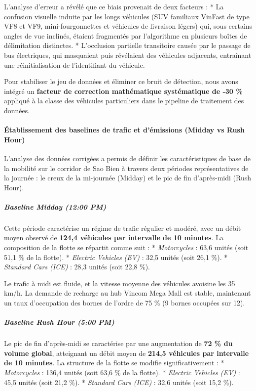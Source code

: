 \documentclass[10pt, a4paper]{article}
\begin{document}
L'analyse d'erreur a révélé que ce biais provenait de deux facteurs : *
La confusion visuelle induite par les longs véhicules (SUV familiaux
VinFast de type VF8 et VF9, mini-fourgonnettes et véhicules de livraison
légers) qui, sous certains angles de vue inclinés, étaient fragmentés
par l'algorithme en plusieurs boîtes de délimitation distinctes. *
L'occlusion partielle transitoire causée par le passage de bus
électriques, qui masquaient puis révélaient des véhicules adjacents,
entraînant une réinitialisation de l'identifiant du véhicule.

Pour stabiliser le jeu de données et éliminer ce bruit de détection,
nous avons intégré un \textbf{facteur de correction mathématique
systématique de -30 \%} appliqué à la classe des véhicules particuliers
dans le pipeline de traitement des données.

\paragraph{Établissement des baselines de trafic et d'émissions (Midday
vs Rush
Hour)}\label{uxe9tablissement-des-baselines-de-trafic-et-duxe9missions-midday-vs-rush-hour}

L'analyse des données corrigées a permis de définir les caractéristiques
de base de la mobilité sur le corridor de Sao Bien à travers deux
périodes représentatives de la journée : le creux de la mi-journée
(Midday) et le pic de fin d'après-midi (Rush Hour).

\subparagraph{Baseline Midday (12:00 PM)}\label{baseline-midday-1200-pm}

Cette période caractérise un régime de trafic régulier et modéré, avec
un débit moyen observé de \textbf{124,4 véhicules par intervalle de 10
minutes}. La composition de la flotte se répartit comme suit : *
\emph{Motorcycles} : 63,6 unités (soit 51,1 \% de la flotte). *
\emph{Electric Vehicles (EV)} : 32,5 unités (soit 26,1 \%). *
\emph{Standard Cars (ICE)} : 28,3 unités (soit 22,8 \%).

Le trafic à midi est fluide, et la vitesse moyenne des véhicules
avoisine les 35 km/h. La demande de recharge au hub Vincom Mega Mall est
stable, maintenant un taux d'occupation des bornes de l'ordre de 75 \%
(9 bornes occupées sur 12).

\subparagraph{Baseline Rush Hour (5:00
PM)}\label{baseline-rush-hour-500-pm}

Le pic de fin d'après-midi se caractérise par une augmentation de
\textbf{72 \% du volume global}, atteignant un débit moyen de
\textbf{214,5 véhicules par intervalle de 10 minutes}. La structure de
la flotte se modifie significativement : * \emph{Motorcycles} : 136,4
unités (soit 63,6 \% de la flotte). * \emph{Electric Vehicles (EV)} :
45,5 unités (soit 21,2 \%). * \emph{Standard Cars (ICE)} : 32,6 unités
(soit 15,2 \%).
\end{document}
